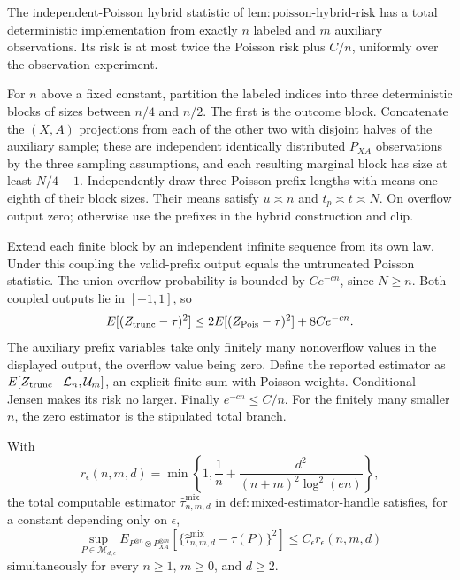 The independent-Poisson hybrid statistic of \(\mathrm{lem:poisson\mbox{-}hybrid\mbox{-}risk}\) has a total deterministic implementation from exactly \(n\) labeled and \(m\) auxiliary observations.  Its risk is at most twice the Poisson risk plus \(C/n\), uniformly over the observation experiment.

For \(n\) above a fixed constant, partition the labeled indices into three deterministic blocks of sizes between \(n/4\) and \(n/2\).  The first is the outcome block.  Concatenate the \((X,A)\) projections from each of the other two with disjoint halves of the auxiliary sample; these are independent identically distributed \(P_{XA}\) observations by the three sampling assumptions, and each resulting marginal block has size at least \(N/4-1\).  Independently draw three Poisson prefix lengths with means one eighth of their block sizes.  Their means satisfy \(u\asymp n\) and \(t_p\asymp t\asymp N\).  On overflow output zero; otherwise use the prefixes in the hybrid construction and clip.

Extend each finite block by an independent infinite sequence from its own law.  Under this coupling the valid-prefix output equals the untruncated Poisson statistic.  The union overflow probability is bounded by \(Ce^{-cn}\), since \(N\ge n\).  Both coupled outputs lie in \([-1,1]\), so
\[
 E[(Z_{\rm trunc}-\tau)^2]\le2E[(Z_{\rm Pois}-\tau)^2]+8Ce^{-cn}.
\]
The auxiliary prefix variables take only finitely many nonoverflow values in the displayed output, the overflow value being zero.  Define the reported estimator as \(E[Z_{\rm trunc}\mid\mathcal L_n,\mathcal U_m]\), an explicit finite sum with Poisson weights.  Conditional Jensen makes its risk no larger.  Finally \(e^{-cn}\le C/n\).  For the finitely many smaller \(n\), the zero estimator is the stipulated total branch.

With
\[
 r_\epsilon(n,m,d)=\min\!\left\{1,\frac1n+\frac{d^2}{(n+m)^2\log^2(en)}\right\},
\]
the total computable estimator \(\widehat\tau^{\mathrm{mix}}_{n,m,d}\) in \(\mathrm{def:mixed\mbox{-}estimator\mbox{-}handle}\) satisfies, for a constant depending only on \(\epsilon\),
\[
 \sup_{P\in\mathcal M_{d,\epsilon}}
 E_{P^{\otimes n}\otimes P_{XA}^{\otimes m}}
 [\{\widehat\tau^{\mathrm{mix}}_{n,m,d}-\tau(P)\}^2]
 \le C_\epsilon r_\epsilon(n,m,d)
\]
simultaneously for every \(n\ge1\), \(m\ge0\), and \(d\ge2\).

